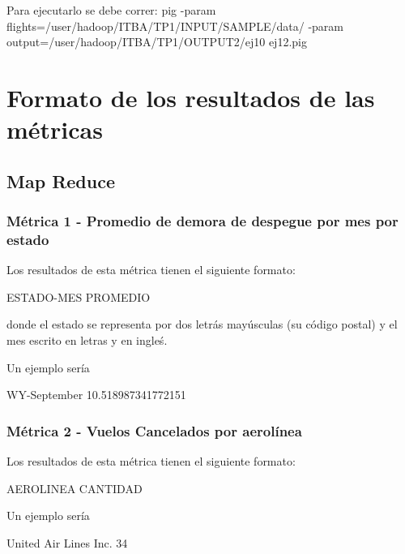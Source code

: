 \documentclass[a4paper,10pt]{article}
\begin{document}
Para ejecutarlo se debe correr: 
pig -param flights=/user/hadoop/ITBA/TP1/INPUT/SAMPLE/data/ -param output=/user/hadoop/ITBA/TP1/OUTPUT2/ej10 ej12.pig



\section{Formato de los resultados de las métricas}

    \subsection{Map Reduce}
        \subsubsection{Métrica 1 - Promedio de demora de despegue por mes por estado}
            Los resultados de esta métrica tienen el siguiente formato:\\
            \begin{center}
                ESTADO-MES PROMEDIO \\
            \end{center}
            donde el estado se representa por dos letrás mayúsculas (su código postal) y el mes escrito en letras y en ingleś.

            Un ejemplo sería\\
            \begin{center}
                WY-September    10.518987341772151\\
            \end{center}

        \subsubsection{Métrica 2 - Vuelos Cancelados por aerolínea}
            Los resultados de esta métrica tienen el siguiente formato:\\
            \begin{center}
                AEROLINEA CANTIDAD\\
            \end{center}

            Un ejemplo sería\\
            \begin{center}
               United Air Lines Inc.   34\\
            \end{center}
\end{document}
